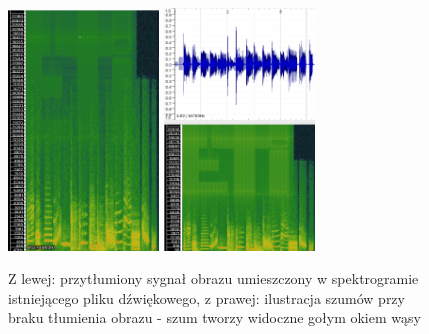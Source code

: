 \documentclass{article}
\begin{document}
\begin{figure}[H]
	\centering
	\includegraphics[width=4cm]{gorszajakosc_spektro}
	\includegraphics[width=4cm]{szumy_spektro}
	\caption{Z lewej: przytłumiony sygnał obrazu umieszczony w spektrogramie istniejącego pliku dźwiękowego, z prawej: ilustracja szumów przy braku tłumienia obrazu - szum tworzy widoczne gołym okiem wąsy}
\end{figure}
\end{document}
